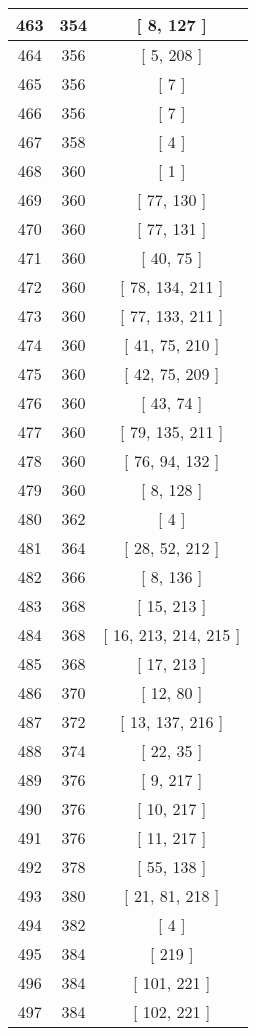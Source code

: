 \begin{center}
\begin{longtable}[H]{|| c c c ||}
\hline
463 & 354 & [ 8, 127 ] \\ 
\hline
464 & 356 & [ 5, 208 ] \\ 
\hline
465 & 356 & [ 7 ] \\ 
\hline
466 & 356 & [ 7 ] \\ 
\hline
467 & 358 & [ 4 ] \\ 
\hline
468 & 360 & [ 1 ] \\ 
\hline
469 & 360 & [ 77, 130 ] \\ 
\hline
470 & 360 & [ 77, 131 ] \\ 
\hline
471 & 360 & [ 40, 75 ] \\ 
\hline
472 & 360 & [ 78, 134, 211 ] \\ 
\hline
473 & 360 & [ 77, 133, 211 ] \\ 
\hline
474 & 360 & [ 41, 75, 210 ] \\ 
\hline
475 & 360 & [ 42, 75, 209 ] \\ 
\hline
476 & 360 & [ 43, 74 ] \\ 
\hline
477 & 360 & [ 79, 135, 211 ] \\ 
\hline
478 & 360 & [ 76, 94, 132 ] \\ 
\hline
479 & 360 & [ 8, 128 ] \\ 
\hline
480 & 362 & [ 4 ] \\ 
\hline
481 & 364 & [ 28, 52, 212 ] \\ 
\hline
482 & 366 & [ 8, 136 ] \\ 
\hline
483 & 368 & [ 15, 213 ] \\ 
\hline
484 & 368 & [ 16, 213, 214, 215 ] \\ 
\hline
485 & 368 & [ 17, 213 ] \\ 
\hline
486 & 370 & [ 12, 80 ] \\ 
\hline
487 & 372 & [ 13, 137, 216 ] \\ 
\hline
488 & 374 & [ 22, 35 ] \\ 
\hline
489 & 376 & [ 9, 217 ] \\ 
\hline
490 & 376 & [ 10, 217 ] \\ 
\hline
491 & 376 & [ 11, 217 ] \\ 
\hline
492 & 378 & [ 55, 138 ] \\ 
\hline
493 & 380 & [ 21, 81, 218 ] \\ 
\hline
494 & 382 & [ 4 ] \\ 
\hline
495 & 384 & [ 219 ] \\ 
\hline
496 & 384 & [ 101, 221 ] \\ 
\hline
497 & 384 & [ 102, 221 ] \\ 

\end{longtable}
\end{center}
